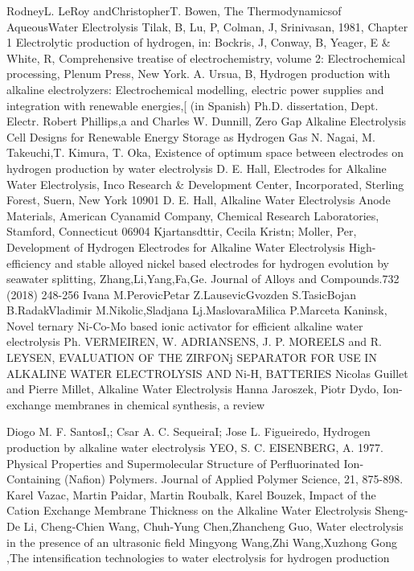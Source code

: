 \begin{thebibliography}{99}
RodneyL. LeRoy andChristopherT. Bowen, The Thermodynamicsof AqueousWater Electrolysis
Tilak, B, Lu, P, Colman, J,  Srinivasan,  1981, Chapter 1  Electrolytic production of hydrogen, in: Bockris, J, Conway, B, Yeager, E \& White, R, Comprehensive treatise of electrochemistry, volume 2: Electrochemical processing, Plenum Press, New York.
A. Ursua, B, Hydrogen production with alkaline electrolyzers: Electrochemical modelling, electric power supplies
and integration with renewable energies,[ (in Spanish) Ph.D. dissertation, Dept. Electr.
Robert Phillips,a and Charles W. Dunnill,  Zero Gap Alkaline Electrolysis Cell Designs for
 Renewable Energy Storage as Hydrogen Gas
N. Nagai, M. Takeuchi,T. Kimura, T. Oka, Existence of optimum space between electrodes on hydrogen production by water electrolysis
D. E. Hall, Electrodes for Alkaline Water Electrolysis, Inco Research \& Development Center, Incorporated, Sterling Forest, Suern, New York 10901
D. E. Hall, Alkaline Water Electrolysis Anode Materials, American Cyanamid Company, Chemical Research Laboratories, Stamford, Connecticut 06904
Kjartansdttir, Cecila Kristn; Moller, Per, Development of Hydrogen Electrodes for Alkaline Water Electrolysis
High-efficiency and stable alloyed nickel based electrodes for hydrogen evolution by seawater splitting, Zhang,Li,Yang,Fa,Ge. Journal of Alloys and Compounds.732 (2018) 248-256
Ivana M.PerovicPetar Z.LausevicGvozden S.TasicBojan B.RadakVladimir M.Nikolic,Sladjana Lj.MaslovaraMilica P.Marceta Kaninsk, Novel ternary Ni-Co-Mo based ionic activator for efficient alkaline water electrolysis
Ph. VERMEIREN, W. ADRIANSENS, J. P. MOREELS and R. LEYSEN,  EVALUATION OF THE ZIRFONj SEPARATOR FOR USE IN ALKALINE WATER ELECTROLYSIS AND Ni-H, BATTERIES
Nicolas Guillet and Pierre Millet, Alkaline Water Electrolysis
Hanna Jaroszek, Piotr Dydo, Ion-exchange membranes in chemical synthesis, a review


Diogo M. F. SantosI,; Csar A. C. SequeiraI; Jose L. Figueiredo, Hydrogen production by alkaline water electrolysis
YEO, S. C.  EISENBERG, A. 1977. Physical Properties and Supermolecular Structure of Perfluorinated
Ion-Containing (Nafion) Polymers. Journal of Applied Polymer Science, 21, 875-898.
Karel Vazac, Martin Paidar, Martin Roubalk, Karel Bouzek, Impact of the Cation Exchange Membrane Thickness on the Alkaline Water Electrolysis
Sheng-De Li, Cheng-Chien Wang, Chuh-Yung Chen,Zhancheng Guo, Water electrolysis in the presence of an ultrasonic field
Mingyong Wang,Zhi Wang,Xuzhong Gong ,The intensification technologies to water electrolysis for hydrogen production


\end{thebibliography}
